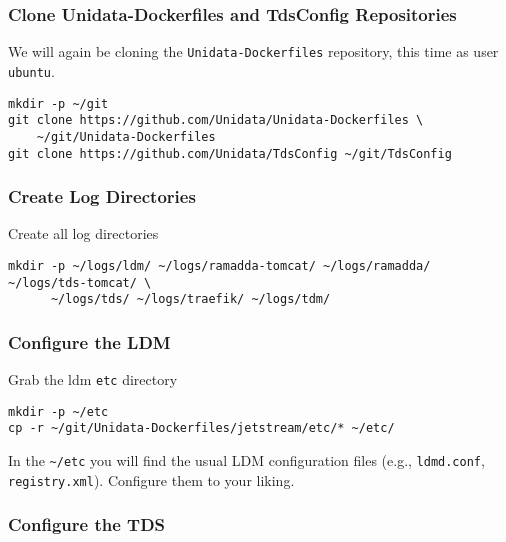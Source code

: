 \documentclass[onecolumn,9pt]{article}
\begin{document}
\subsubsection{Clone Unidata-Dockerfiles and TdsConfig Repositories}
\label{sec:orgheadline19}

We will again be cloning the \texttt{Unidata-Dockerfiles} repository, this time as user \texttt{ubuntu}.

\lstset{frame=lines,basicstyle=\footnotesize,numbers=left,numberstyle=\tiny,language=sh,label= ,caption= ,captionpos=b}
\begin{lstlisting}
mkdir -p ~/git
git clone https://github.com/Unidata/Unidata-Dockerfiles \
    ~/git/Unidata-Dockerfiles
git clone https://github.com/Unidata/TdsConfig ~/git/TdsConfig
\end{lstlisting}

\subsubsection{Create Log Directories}
\label{sec:orgheadline20}

Create all log directories

\lstset{frame=lines,basicstyle=\footnotesize,numbers=left,numberstyle=\tiny,language=sh,label= ,caption= ,captionpos=b}
\begin{lstlisting}
mkdir -p ~/logs/ldm/ ~/logs/ramadda-tomcat/ ~/logs/ramadda/ ~/logs/tds-tomcat/ \
      ~/logs/tds/ ~/logs/traefik/ ~/logs/tdm/
\end{lstlisting}

\subsubsection{Configure the LDM}
\label{sec:orgheadline21}

Grab the ldm \texttt{etc} directory

\lstset{frame=lines,basicstyle=\footnotesize,numbers=left,numberstyle=\tiny,language=sh,label= ,caption= ,captionpos=b}
\begin{lstlisting}
mkdir -p ~/etc
cp -r ~/git/Unidata-Dockerfiles/jetstream/etc/* ~/etc/
\end{lstlisting}

In the \texttt{\textasciitilde{}/etc} you will find the usual LDM configuration files (e.g., \texttt{ldmd.conf}, \texttt{registry.xml}). Configure them to your liking.

\subsubsection{Configure the TDS}
\label{sec:orgheadline23}
\end{document}
